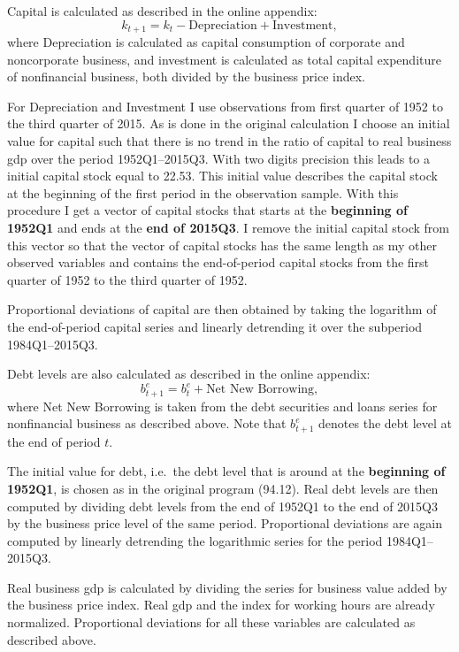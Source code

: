 Capital is calculated as described in the online appendix:
  \begin{equation}
  \label{eq:capital_original}
  k_{t+1} = k_t - \text{Depreciation} + \text{Investment},
  \end{equation}
where Depreciation is calculated as capital consumption of corporate and
noncorporate business, and investment is calculated as total capital
expenditure of nonfinancial business, both divided by the business price
index.

For Depreciation and Investment I use observations from first quarter of 1952
to the third quarter of 2015. As is done in the original calculation I choose an
initial value for capital such that there is no trend in the ratio of capital
to real business gdp over the period 1952Q1--2015Q3. With two digits precision
this leads to a initial capital stock equal to 22.53. This initial value
describes the capital stock at the beginning of the first period in the
observation sample. With this procedure I get a vector of capital stocks that
starts at the \textbf{beginning of 1952Q1} and ends at the \textbf{end of
  2015Q3}. I remove the initial capital stock from this vector so that the
vector of capital stocks has the same length as my other observed variables and
contains the end-of-period capital stocks from the first quarter of 1952 to the
third quarter of 1952.

Proportional deviations of capital are then obtained by taking the logarithm of
the end-of-period capital series and linearly detrending it over the subperiod
1984Q1--2015Q3. 

Debt levels are also calculated as described in the online appendix:
\begin{equation}
    b_{t+1}^e = b_t^e + \text{Net New Borrowing},
\end{equation}
where Net New Borrowing is taken from the debt securities and loans series for
nonfinancial business as described above. Note that \( b^{e}_{t+1} \) denotes the
debt level at the end of period \(t\).

The initial value for debt, i.e.\ the debt level that is around at the
\textbf{beginning of 1952Q1}, is chosen as in the original program
(94.12). Real debt levels are then computed by dividing debt levels from the
end of 1952Q1 to the end of 2015Q3 by the business price level of the same
period. Proportional deviations are again computed by linearly detrending the
logarithmic series for the period 1984Q1--2015Q3.

Real business gdp is calculated by dividing the series for business value added
by the business price index. Real gdp and the index for working hours are
already normalized. Proportional deviations for all these variables are
calculated as described above.

